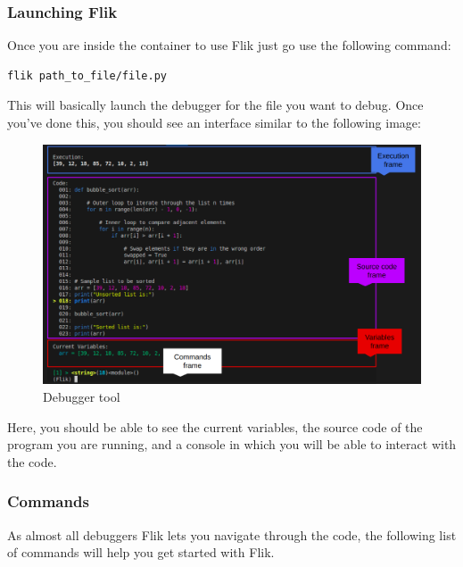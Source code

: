 \subsubsection{Launching Flik}

Once you are inside the container to use Flik just go use the following command:

\begin{lstlisting}[language=bash]
flik path_to_file/file.py
\end{lstlisting}

This will basically launch the debugger for the file you want to debug. Once you’ve done this, you should 
see an interface similar to the following image:

\begin{figure}[h]
    \centering
    \includegraphics[width=1\textwidth]{figures/flik_interface.png}
    \caption{Debugger tool}
    \label{fig:debugger}
\end{figure}

Here, you should be able to see the current variables, the source code of the program you are running, 
and a console in which you will be able to interact with the code.

\subsubsection{Commands}
As almost all debuggers Flik lets you navigate through the code, the following list of commands will help 
you get started with Flik.

